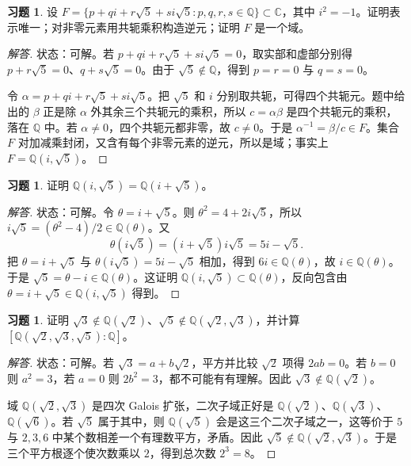 \documentclass[11pt,a4paper,openany]{ctexbook}
\numberwithin{equation}{chapter}
\newcommand{\Q}{\mathbb{Q}}
\newcommand{\C}{\mathbb{C}}
\theoremstyle{plain}
\theoremstyle{definition}
\newtheorem{exercise}[theorem]{习题}
\theoremstyle{remark}
\begin{document}
\begin{exercise}
设 $F=\{p+qi+r\sqrt5+si\sqrt5:p,q,r,s\in\Q\}\subset\C$，其中 $i^2=-1$。证明表示唯一；对非零元素用共轭乘积构造逆元；证明 $F$ 是一个域。
\end{exercise}
\begin{proof}[解答]
状态：可解。若 $p+qi+r\sqrt5+si\sqrt5=0$，取实部和虚部分别得 $p+r\sqrt5=0$、$q+s\sqrt5=0$。由于 $\sqrt5\notin\Q$，得到 $p=r=0$ 与 $q=s=0$。

令 $\alpha=p+qi+r\sqrt5+si\sqrt5$。把 $\sqrt5$ 和 $i$ 分别取共轭，可得四个共轭元。题中给出的 $\beta$ 正是除 $\alpha$ 外其余三个共轭元的乘积，所以 $c=\alpha\beta$ 是四个共轭元的乘积，落在 $\Q$ 中。若 $\alpha\ne0$，四个共轭元都非零，故 $c\ne0$。于是 $\alpha^{-1}=\beta/c\in F$。集合 $F$ 对加减乘封闭，又含有每个非零元素的逆元，所以是域；事实上 $F=\Q(i,\sqrt5)$。
\end{proof}

\begin{exercise}
证明 $\Q(i,\sqrt5)=\Q(i+\sqrt5)$。
\end{exercise}
\begin{proof}[解答]
状态：可解。令 $\theta=i+\sqrt5$。则 $\theta^2=4+2i\sqrt5$，所以 $i\sqrt5=(\theta^2-4)/2\in\Q(\theta)$。又
\[
\theta(i\sqrt5)=(i+\sqrt5)i\sqrt5=5i-\sqrt5.
\]
把 $\theta=i+\sqrt5$ 与 $\theta(i\sqrt5)=5i-\sqrt5$ 相加，得到 $6i\in\Q(\theta)$，故 $i\in\Q(\theta)$。于是 $\sqrt5=\theta-i\in\Q(\theta)$。这证明 $\Q(i,\sqrt5)\subset\Q(\theta)$，反向包含由 $\theta=i+\sqrt5\in\Q(i,\sqrt5)$ 得到。
\end{proof}

\begin{exercise}
证明 $\sqrt3\notin\Q(\sqrt2)$、$\sqrt5\notin\Q(\sqrt2,\sqrt3)$，并计算 $[\Q(\sqrt2,\sqrt3,\sqrt5):\Q]$。
\end{exercise}
\begin{proof}[解答]
状态：可解。若 $\sqrt3=a+b\sqrt2$，平方并比较 $\sqrt2$ 项得 $2ab=0$。若 $b=0$ 则 $a^2=3$，若 $a=0$ 则 $2b^2=3$，都不可能有有理解。因此 $\sqrt3\notin\Q(\sqrt2)$。

域 $\Q(\sqrt2,\sqrt3)$ 是四次 Galois 扩张，二次子域正好是 $\Q(\sqrt2)$、$\Q(\sqrt3)$、$\Q(\sqrt6)$。若 $\sqrt5$ 属于其中，则 $\Q(\sqrt5)$ 会是这三个二次子域之一，这等价于 $5$ 与 $2,3,6$ 中某个数相差一个有理数平方，矛盾。因此 $\sqrt5\notin\Q(\sqrt2,\sqrt3)$。于是三个平方根逐个使次数乘以 $2$，得到总次数 $2^3=8$。
\end{proof}
\end{document}
